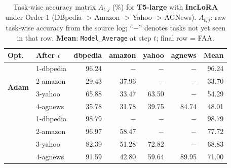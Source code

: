 \begin{table}[ht]
\centering
\caption{%
  Task-wise accuracy matrix $A_{t,j}$ (\%) for \textbf{T5-large} with \textbf{IncLoRA} under Order 1 (DBpedia -> Amazon -> Yahoo -> AGNews).
  $A_{t,j}$: raw task-wise accuracy from the source log; ``$-$'' denotes tasks not yet seen in that row.
  \textbf{Mean}: \texttt{Model\_Average} at step $t$; final row = FAA.
}
\label{tab:nlp_o1_t5large_inclora}
\setlength{\tabcolsep}{4.0pt}
\renewcommand{\arraystretch}{0.92}
\scriptsize
\begin{tabular}{@{}l l r r r r r@{}}
\toprule
\textbf{Opt.} & \textbf{After $t$} & \textbf{dbpedia} & \textbf{amazon} & \textbf{yahoo} & \textbf{agnews} & \textbf{Mean} \\
\midrule
\multirow{4}{*}{\textbf{Adam}} & 1-dbpedia & 96.24 & $-$ & $-$ & $-$ & 96.24 \\
 & 2-amazon & 29.43 & 37.96 & $-$ & $-$ & 33.70 \\
 & 3-yahoo & 65.88 & 33.47 & 63.50 & $-$ & 54.29 \\
 & 4-agnews & 35.78 & 31.78 & 39.75 & 84.74 & 48.01 \\
\addlinespace[2pt]
\multirow{4}{*}{\textbf{SAM}} & 1-dbpedia & 98.79 & $-$ & $-$ & $-$ & 98.79 \\
 & 2-amazon & 96.97 & 58.47 & $-$ & $-$ & 77.72 \\
 & 3-yahoo & 82.39 & 51.28 & 72.82 & $-$ & 68.83 \\
 & 4-agnews & 91.59 & 42.80 & 59.64 & 89.95 & 71.00 \\
\bottomrule
\end{tabular}
\end{table}

